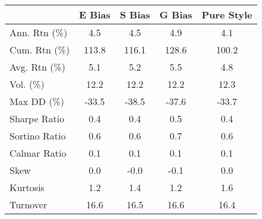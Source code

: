 \begin{tabular}{lcccc}
\toprule
 & E Bias & S Bias & G Bias & Pure Style \\
\midrule
Ann. Rtn (\%) & 4.5 & 4.5 & 4.9 & 4.1 \\
Cum. Rtn (\%) & 113.8 & 116.1 & 128.6 & 100.2 \\
Avg. Rtn (\%) & 5.1 & 5.2 & 5.5 & 4.8 \\
Vol. (\%) & 12.2 & 12.2 & 12.2 & 12.3 \\
Max DD (\%) & -33.5 & -38.5 & -37.6 & -33.7 \\
Sharpe Ratio & 0.4 & 0.4 & 0.5 & 0.4 \\
Sortino Ratio & 0.6 & 0.6 & 0.7 & 0.6 \\
Calmar Ratio & 0.1 & 0.1 & 0.1 & 0.1 \\
Skew & 0.0 & -0.0 & -0.1 & 0.0 \\
Kurtosis & 1.2 & 1.4 & 1.2 & 1.6 \\
Turnover & 16.6 & 16.5 & 16.6 & 16.4 \\
\bottomrule
\end{tabular}
